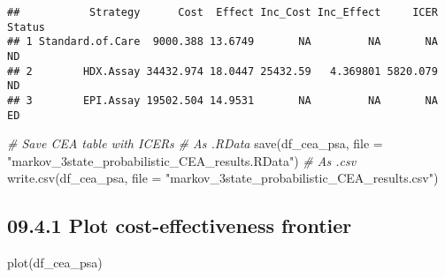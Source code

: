 \documentclass[
]{article}
\newenvironment{Shaded}{\begin{snugshade}}{\end{snugshade}}
\newcommand{\AttributeTok}[1]{\textcolor[rgb]{0.77,0.63,0.00}{#1}}
\newcommand{\CommentTok}[1]{\textcolor[rgb]{0.56,0.35,0.01}{\textit{#1}}}
\newcommand{\FunctionTok}[1]{\textcolor[rgb]{0.00,0.00,0.00}{#1}}
\newcommand{\NormalTok}[1]{#1}
\newcommand{\OtherTok}[1]{\textcolor[rgb]{0.56,0.35,0.01}{#1}}
\newcommand{\SpecialCharTok}[1]{\textcolor[rgb]{0.00,0.00,0.00}{#1}}
\newcommand{\StringTok}[1]{\textcolor[rgb]{0.31,0.60,0.02}{#1}}
\begin{document}
\begin{Shaded}
\end{Shaded}

\begin{verbatim}
##           Strategy      Cost  Effect Inc_Cost Inc_Effect     ICER Status
## 1 Standard.of.Care  9000.388 13.6749       NA         NA       NA     ND
## 2        HDX.Assay 34432.974 18.0447 25432.59   4.369801 5820.079     ND
## 3        EPI.Assay 19502.504 14.9531       NA         NA       NA     ED
\end{verbatim}

\begin{Shaded}
\begin{Highlighting}[]
\CommentTok{\# Save CEA table with ICERs}
\CommentTok{\# As .RData}
\FunctionTok{save}\NormalTok{(df\_cea\_psa, }
     \AttributeTok{file =} \StringTok{"markov\_3state\_probabilistic\_CEA\_results.RData"}\NormalTok{)}
\CommentTok{\# As .csv}
\FunctionTok{write.csv}\NormalTok{(df\_cea\_psa, }
          \AttributeTok{file =} \StringTok{"markov\_3state\_probabilistic\_CEA\_results.csv"}\NormalTok{)}
\end{Highlighting}
\end{Shaded}

\hypertarget{plot-cost-effectiveness-frontier}{%
\subsection{09.4.1 Plot cost-effectiveness
frontier}\label{plot-cost-effectiveness-frontier}}

\begin{Shaded}
\begin{Highlighting}[]
\FunctionTok{plot}\NormalTok{(df\_cea\_psa)}
\end{Highlighting}
\end{Shaded}
\end{document}
